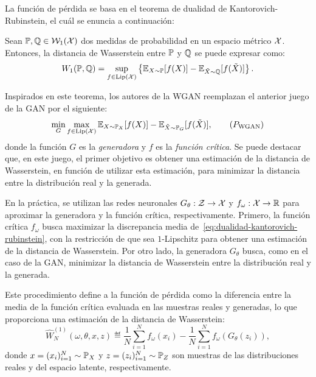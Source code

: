La función de pérdida se basa en el teorema de dualidad de Kantorovich-Rubinstein, el cuál se enuncia a continuación:
\begin{theorem}\label{thm:dualidad-kantorovich-rubinstein}
    Sean $\Prob, \ProbQ \in \WassersteinSpace[1]{\cX}$ dos medidas de probabilidad en un espacio métrico $\mathcal{X}$. Entonces, la distancia de Wasserstein entre $\Prob$ y $\ProbQ$ se puede expresar como:
    \begin{equation}\label{eq:dualidad-kantorovich-rubinstein}
        \Wasserstein[1]{\Prob}{\ProbQ} = \sup_{f \in \Lip[\cX]} \left\{ \Exp_{X\sim \Prob} [f(X)] - \Exp_{\tilde X \sim \ProbQ} [f(\tilde X)] \right\}.
    \end{equation}
\end{theorem}

Inspirados en este teorema, los autores de la WGAN \cite{arjovsky2017wasserstein} reemplazan el anterior juego de la GAN por el siguiente:
\begin{equation}\label{eq:wgan-game}
    \min_{G} \max_{f \in \Lip[\cX]} \Exp_{X\sim \Prob_X} [f(X)] - \Exp_{\tilde X \sim \Prob_G} [f(\tilde X)],\tag{$P_{\mathrm{WGAN}}$}
\end{equation}
donde la función $G$ es la \textit{generadora} y $f$ es la \textit{función crítica}. Se puede destacar que, en este juego, el primer objetivo es obtener una estimación de la distancia de Wasserstein, en función de utilizar esta estimación, para minimizar la distancia entre la distribución real y la generada.

En la práctica, se utilizan las redes neuronales $G_\theta: \mathcal{Z} \to \mathcal{X}$ y $f_\omega: \mathcal{X} \to \mathbb{R}$ para aproximar la generadora y la función crítica, respectivamente.
Primero, la función crítica $f_\omega$ busca maximizar la discrepancia media de~\eqref{eq:dualidad-kantorovich-rubinstein}, con la restricción de que sea $1$-Lipschitz para obtener una estimación de la distancia de Wasserstein. Por otro lado, la generadora $G_\theta$ busca, como en el caso de la GAN, minimizar la distancia de Wasserstein entre la distribución real y la generada.

Este procedimiento define a la función de pérdida como
la diferencia entre la media de la función crítica evaluada en las muestras reales y generadas, lo que proporciona una estimación de la distancia de Wasserstein:
\begin{equation}\label{eq:wasserstein-estimation}
    \widehat W_N^{(1)} (
    \omega, \theta, x, z
    )
    \eqdef \frac{1}{N}\sum_{i=1}^{N} f_\omega(x_i) - \frac{1}{N}\sum_{i=1}^{N} f_\omega(G_\theta(z_i)),
\end{equation}
donde $x = (x_i)_{i=1}^{N} \sim \Prob_X$ y $z = (z_i)_{i=1}^{N} \sim \Prob_Z$ son muestras de las distribuciones reales y del espacio latente, respectivamente.

